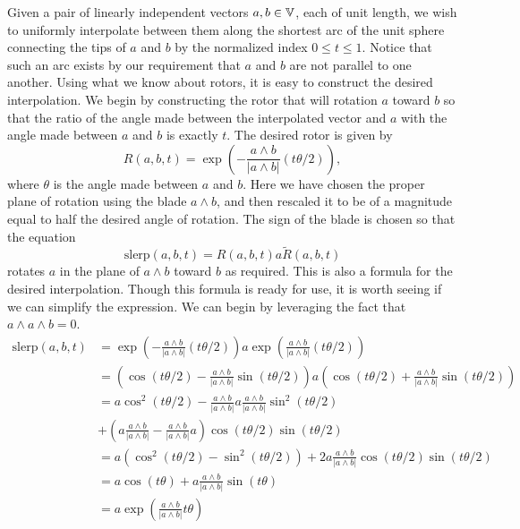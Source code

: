 \documentclass{article}
\begin{document}
Given a pair of linearly independent vectors $a,b\in\mathbb{V}$, each
of unit length, we wish to uniformly interpolate between them along
the shortest arc of the unit sphere connecting
the tips of $a$ and $b$ by the normalized index $0\leq t\leq 1$.  Notice that
such an arc exists by our requirement that $a$ and $b$ are not parallel to
one another.  Using what we know about rotors, it is easy to
construct the desired interpolation.  We begin by constructing
the rotor that will rotation $a$ toward $b$ so that the ratio
of the angle made between the interpolated vector and $a$ with
the angle made between $a$ and $b$ is exactly $t$.  The desired
rotor is given by
\begin{equation*}
R(a,b,t) = \exp\left(-\frac{a\wedge b}{|a\wedge b|}(t\theta/2)\right),
\end{equation*}
where $\theta$ is the angle made between $a$ and $b$.
Here we have chosen the proper plane of rotation using the
blade $a\wedge b$, and then rescaled it to be of a magnitude
equal to half the desired angle of rotation.  The sign of
the blade is chosen so that the equation
\begin{equation*}
\mbox{slerp}(a,b,t) = R(a,b,t)a\tilde{R}(a,b,t)
\end{equation*}
rotates $a$ in the plane of $a\wedge b$ toward $b$ as required.
This is also a formula for the desired interpolation.
Though this formula is ready for use, it is worth seeing if
we can simplify the expression.  We can begin by leveraging
the fact that $a\wedge a\wedge b=0$.
\begin{align*}
\mbox{slerp}(a,b,t) &=
\exp\left(-\frac{a\wedge b}{|a\wedge b|}(t\theta/2)\right)a
\exp\left(\frac{a\wedge b}{|a\wedge b|}(t\theta/2)\right) \\
 &= \left(\cos(t\theta/2)-\frac{a\wedge b}{|a\wedge b|}\sin(t\theta/2)\right)a
\left(\cos(t\theta/2)+\frac{a\wedge b}{|a\wedge b|}\sin(t\theta/2)\right) \\
 &= a\cos^2(t\theta/2)-\frac{a\wedge b}{|a\wedge b|}a\frac{a\wedge b}{|a\wedge b|}\sin^2(t\theta/2) \\
 &+ \left(a\frac{a\wedge b}{|a\wedge b|}-\frac{a\wedge b}{|a\wedge b|}a\right)\cos(t\theta/2)\sin(t\theta/2) \\
 &= a(\cos^2(t\theta/2)-\sin^2(t\theta/2))
 + 2a\frac{a\wedge b}{|a\wedge b|}\cos(t\theta/2)\sin(t\theta/2) \\
 &= a\cos(t\theta)+a\frac{a\wedge b}{|a\wedge b|}\sin(t\theta) \\
 &= a\exp\left(\frac{a\wedge b}{|a\wedge b|}t\theta\right)
\end{align*}
\end{document}
